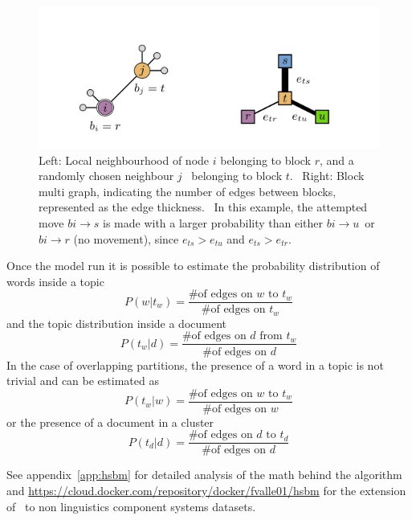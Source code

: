 \begin{figure}[htb!]
  \centering
  \includegraphics[width=0.9\linewidth]{pictures/topic/peixioto_move.jpg}
  \caption{Left: Local neighbourhood of node $i$ belonging to block $r$, and a randomly chosen neighbour $j$ \
  belonging to block $t$. \
  Right: Block multi graph, indicating the number of edges between blocks, represented as the edge thickness. \
  In this example, the attempted move $bi \to s$ is made with a larger probability than either $bi \to u$\
   or $bi \to r$ (no movement), since $e_{ts}>e_{tu}$ and $e_{ts}>e_{tr}$.}
  \label{fig:topic_pixioto_move}
\end{figure}

Once the model run it is possible to estimate the probability distribution of words inside a topic
\[P(w|t_w)=\frac{\text{\# of edges on $w$ to $t_w$}}{\text{\# of edges on $t_w$}}\]
and the topic distribution inside a document
\[P(t_w|d)=\frac{\text{\# of edges on $d$ from $t_w$}}{\text{\# of edges on $d$}}\]
In the case of overlapping partitions, the presence of a word in a topic is not trivial and can be estimated as 
\[P(t_w|w)=\frac{\text{\# of edges on $w$ to $t_w$}}{\text{\# of edges on $w$}}\]
or the presence of a document in a cluster
\[P(t_d|d)=\frac{\text{\# of edges on $d$ to $t_d$}}{\text{\# of edges on $d$}}\]

See appendix~\ref{app:hsbm} for detailed analysis of the math behind the algorithm and \url{https://cloud.docker.com/repository/docker/fvalle01/hsbm} for the extension of~\cite{gerlach2018network} to non linguistics component systems datasets.